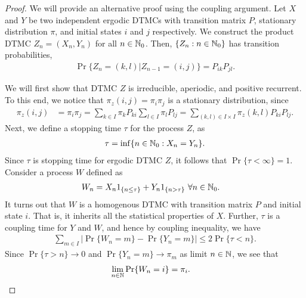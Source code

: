 \documentclass[a4paper,10pt,english]{article}
\begin{document}
\begin{proof}
We will provide an alternative proof using the coupling argument. 
Let $X$ and $Y$ be two independent ergodic DTMCs with transition matrix $P$, stationary distribution $\pi$, and initial states $i$ and $j$ respectively. 
We construct the product DTMC $Z_n = (X_n, Y_n)$ for all $n \in \mathbb{N}_0$. Then, $\{Z_n: n \in \mathbb{N}_0\}$ has transition probabilities,
\begin{align*}
\Pr\{Z_n = (k,l)|Z_{n-1} = (i,j)\} = P_{ik} P_{jl}.
\end{align*}

We will first show that DTMC $Z$ is irreducible, aperiodic, and positive recurrent. 
To this end, we notice that $\pi_z(i,j) = \pi_i \pi_j$ is a stationary distribution, since
\begin{align*}
\pi_z(i,j) &=  \pi_i \pi_j = \sum_{k \in I}\pi_kP_{ki} \sum_{l \in I}\pi_lP_{lj} = \sum_{(k,l) \in I \times I}\pi_z(k,l)P_{ki}P_{lj}.
\end{align*}
Next, we define a stopping time $\tau$ for the process $Z$, as 
\begin{align*}
\tau = \inf\{n \in \mathbb{N}_0 : X_n = Y_n \}.
\end{align*}
Since $\tau$ is stopping time for ergodic DTMC $Z$, it follows that $\Pr\{\tau < \infty\} = 1$. 
Consider a process $W$ defined as 
\begin{align*}
W_n &= X_n1_{\{ n \leq \tau\}} + Y_n1_{\{n > \tau\}}~\forall n \in \mathbb{N}_0.
\end{align*}
It turns out that $W$  is a homogenous DTMC with transition matrix $P$ and initial state $i$. 
That is, it inherits all the statistical properties of $X$. 
Further, $\tau$ is a coupling time for $Y$ and $W$, and hence by coupling inequality, we have 
\begin{align*}
 \sum_{m \in I} \lvert \Pr\{W_n = m\} - \Pr\{Y_n = m\} \rvert \leq 2\Pr\{\tau < n\}.
\end{align*}
Since $\Pr\{\tau > n\} \to 0$ and $\Pr\{Y_n = m\} \to \pi_m$ as limit $n \in \mathbb{N}$, we see that
\begin{align*}
\lim_{n \in \mathbb{N}} \Pr\{W_n = i\} &= \pi_i. 
\end{align*}
\end{proof}
\end{document}
